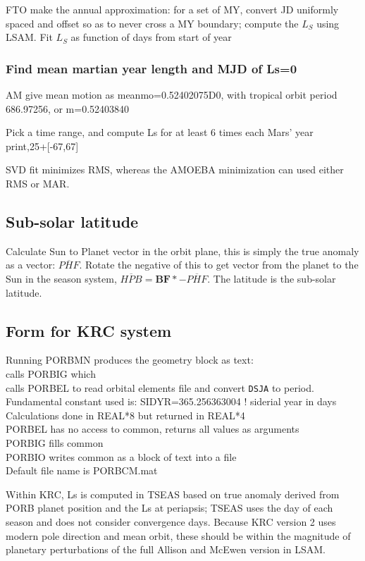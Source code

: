 \documentclass[draft]{article}
\newcommand{\qi}{\\ \hspace*{2.em}}      %
\newcommand{\qii}{\\ \hspace*{4.em}}     %
\newcommand{\qiii}{\\ \hspace*{6.em}}    %
\newcommand{\qv}{\overline}       %
\newcommand{\nv}{\texttt}  %
\begin{document}
FTO make the annual approximation: for a set of MY, convert JD uniformly spaced
and offset so as to never cross a MY boundary; compute the $L_S$ using LSAM.
Fit $L_S$ as function of days from start of year

\subsubsection{Find mean martian year length and MJD of Ls=0}

AM give mean motion as meanmo=0.52402075D0, with tropical orbit period  686.97256, or m=0.52403840 

Pick a time range, and compute Ls for at least 6 times each Mars' year 
\\ print,25+[-67,67]

SVD fit minimizes RMS, whereas the AMOEBA minimization can used either RMS or MAR.   

\subsection{Sub-solar latitude} 
Calculate Sun to Planet vector in the orbit plane, this is simply the true
anomaly as a vector: $\qv{PHF} $. Rotate the negative of this to get vector from
the planet to the Sun in the season system, $ \qv{HPB}= \mathbf{BF} \ast
-\qv{PHF} $. The latitude is the sub-solar latitude.

\subsection{Form for KRC system}
Running PORBMN produces the geometry block as text:
\qi calls PORBIG which
\qii calls PORBEL to read orbital elements file and convert \nv{DSJA}  to period.
\qiii Fundamental constant used is: SIDYR=365.256363004  ! siderial year in days
\qii Calculations done in REAL*8 but returned in REAL*4
\qii PORBEL has no access to common, returns all values as arguments
\qi  PORBIG fills common 
\qi  PORBIO writes common as a block of text into a file
\qii Default file name is PORBCM.mat

\vspace{2.mm}

Within KRC, Ls is computed in TSEAS based on true anomaly derived from PORB
planet position and the Ls at periapsis; TSEAS uses the day of each season and
does not consider convergence days. Because KRC version 2 uses modern pole
direction and mean orbit, these should be within the magnitude of planetary
perturbations of the full Allison and McEwen version in LSAM.
\end{document}
